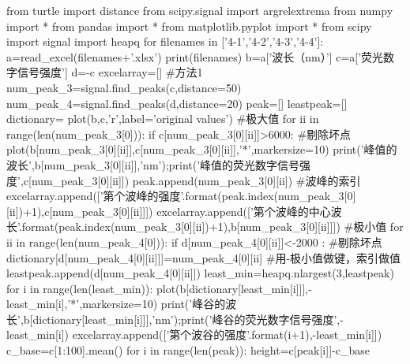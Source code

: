 \documentclass{article}
\numberwithin{equation}{subsection}
\begin{document}
\begin{python}
from turtle import distance
from scipy.signal import argrelextrema
from numpy import *
from pandas import *
from matplotlib.pyplot import *
from scipy import signal
import heapq
for filenames in ['4-1','4-2','4-3','4-4']:
    a=read_excel(filenames+'.xlsx')
    print(filenames)
    b=a['波长（nm）']
    c=a['荧光数字信号强度']
    d=-c
    excelarray=[]
    #方法1
    num_peak_3=signal.find_peaks(c,distance=50)
    num_peak_4=signal.find_peaks(d,distance=20)
    peak=[]
    leastpeak=[]
    dictionary={}
    plot(b,c,'r',label='original values')
    #极大值
    for ii in range(len(num_peak_3[0])):
        if c[num_peak_3[0][ii]]>6000:          #剔除坏点
            plot(b[num_peak_3[0][ii]],c[num_peak_3[0][ii]],'*',markersize=10) 
            print('峰值的波长',b[num_peak_3[0][ii]],'nm');print('峰值的荧光数字信号强度',c[num_peak_3[0][ii]])
            peak.append(num_peak_3[0][ii])          #波峰的索引
            excelarray.append(['第{}个波峰的强度'.format(peak.index(num_peak_3[0][ii])+1),c[num_peak_3[0][ii]]])
            excelarray.append(['第{}个波峰的中心波长'.format(peak.index(num_peak_3[0][ii])+1),b[num_peak_3[0][ii]]])
    #极小值
    for ii in range(len(num_peak_4[0])):
        if  d[num_peak_4[0][ii]]<-2000 :          #剔除坏点
            dictionary[d[num_peak_4[0][ii]]]=num_peak_4[0][ii]          #用-极小值做键，索引做值
            leastpeak.append(d[num_peak_4[0][ii]])
    least_min=heapq.nlargest(3,leastpeak)
    for i in range(len(least_min)):
        plot(b[dictionary[least_min[i]]],-least_min[i],'*',markersize=10) 
        print('峰谷的波长',b[dictionary[least_min[i]]],'nm');print('峰谷的荧光数字信号强度',-least_min[i])
        excelarray.append(['第{}个波谷的强度'.format(i+1),-least_min[i]])
    c_base=c[1:100].mean()
    for i in range(len(peak)):  
        height=c[peak[i]]-c_base


\end{python}
\end{document}
